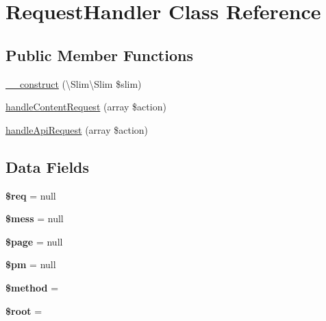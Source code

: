 \hypertarget{class_lora_1_1_request_handler}{}\section{Request\+Handler Class Reference}
\label{class_lora_1_1_request_handler}
\subsection*{Public Member Functions}
\begin{DoxyCompactItemize}
\item 
\hyperlink{class_lora_1_1_request_handler_ae94f71807587d45d185150087e3c313d}{\+\_\+\+\_\+construct} (\textbackslash{}Slim\textbackslash{}\+Slim \$slim)
\item 
\hyperlink{class_lora_1_1_request_handler_a4412064a62ba010ac44ba67fae996ee9}{handle\+Content\+Request} (array \$action)
\item 
\hyperlink{class_lora_1_1_request_handler_af59b79c7f32e254704d9388105a67bee}{handle\+Api\+Request} (array \$action)
\end{DoxyCompactItemize}
\subsection*{Data Fields}
\begin{DoxyCompactItemize}
\item 
\mbox{\label{class_lora_1_1_request_handler_a63a7a283ea5dee8af1e2d5a3435bf370}} 
{\bfseries \$req} = null
\item 
\mbox{\label{class_lora_1_1_request_handler_a7402b7f726abbbfe8793e75fafcd5e91}} 
{\bfseries \$mess} = null
\item 
\mbox{\label{class_lora_1_1_request_handler_a0a44e6760141442bb439b1ab1395d8ff}} 
{\bfseries \$page} = null
\item 
\mbox{\label{class_lora_1_1_request_handler_a0002d5f2a35dc15ffc92761388fd9bb8}} 
{\bfseries \$pm} = null
\item 
\mbox{\label{class_lora_1_1_request_handler_a12661b2fc0f57f97e30a1620889ce9c6}} 
{\bfseries \$method} = \textquotesingle{}\textquotesingle{}
\item 
\mbox{\label{class_lora_1_1_request_handler_ab37f7c32f41c3c61ed940887453767f4}} 
{\bfseries \$root} = \textquotesingle{}\textquotesingle{}
\end{DoxyCompactItemize}
